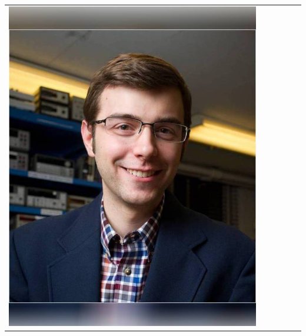 \documentclass[landscape,a0paper,fontscale=0.292]{baposter}
\begin{document}
\begin{poster}
{\begin{center}
\begin{tabularx}{\linewidth}{X X X X X X}
{\centering \includegraphics[width=0.6\linewidth]{npd22.jpg}}\\ 


\end{tabularx}
\end{center}}
\end{poster}
\end{document}
